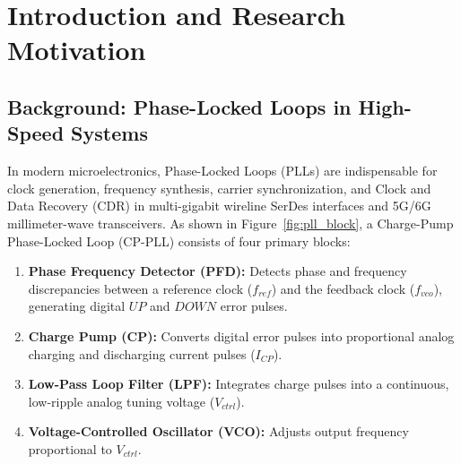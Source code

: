 \documentclass[11pt,a4paper]{report}
\begin{document}
\newpage

\tableofcontents
\newpage
\listoffigures
\newpage
\listoftables
\newpage

\setcounter{page}{1}

\chapter{Introduction and Research Motivation}

\section{Background: Phase-Locked Loops in High-Speed Systems}
In modern microelectronics, Phase-Locked Loops (PLLs) are indispensable for clock generation, frequency synthesis, carrier synchronization, and Clock and Data Recovery (CDR) in multi-gigabit wireline SerDes interfaces and 5G/6G millimeter-wave transceivers. As shown in Figure~\ref{fig:pll_block}, a Charge-Pump Phase-Locked Loop (CP-PLL) consists of four primary blocks:
\begin{enumerate}
    \item \textbf{Phase Frequency Detector (PFD):} Detects phase and frequency discrepancies between a reference clock ($f_{ref}$) and the feedback clock ($f_{vco}$), generating digital $UP$ and $DOWN$ error pulses.
    \item \textbf{Charge Pump (CP):} Converts digital error pulses into proportional analog charging and discharging current pulses ($I_{CP}$).
    \item \textbf{Low-Pass Loop Filter (LPF):} Integrates charge pulses into a continuous, low-ripple analog tuning voltage ($V_{ctrl}$).
    \item \textbf{Voltage-Controlled Oscillator (VCO):} Adjusts output frequency proportional to $V_{ctrl}$.
\end{enumerate}
\end{document}
